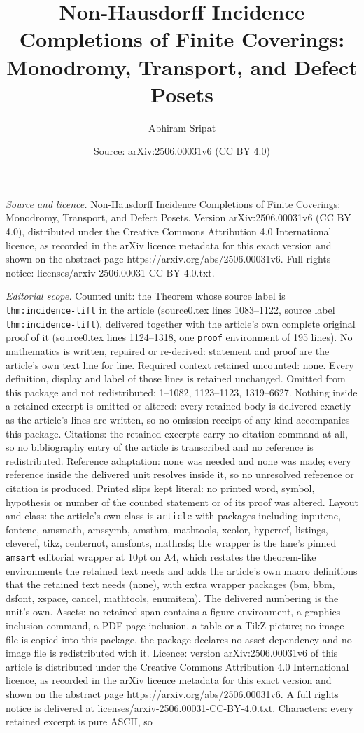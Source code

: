 \documentclass[10pt,a4paper]{amsart}
\title[Non-Hausdorff Incidence Completions of Finite Coverings: Mon]{Non-Hausdorff Incidence Completions of Finite Coverings: Monodromy, Transport, and Defect Posets}
\author{Abhiram Sripat}
\date{Source: arXiv:2506.00031v6 (CC BY 4.0)}
\begin{document}
\maketitle

\noindent\emph{Source and licence.} Non-Hausdorff Incidence Completions of Finite Coverings: Monodromy, Transport, and Defect Posets. Version arXiv:2506.00031v6 (CC BY 4.0), distributed under the Creative Commons Attribution 4.0 International licence, as recorded in the arXiv licence metadata for this exact version and shown on the abstract page https://arxiv.org/abs/2506.00031v6. Full rights notice: licenses/arxiv-2506.00031-CC-BY-4.0.txt.\par\smallskip

\noindent\textit{Editorial scope.} Counted unit: the Theorem whose source label is \texttt{thm:incidence-lift} in the article (source0.tex lines 1083--1122, source label \texttt{thm:incidence-lift}), delivered together with the article's own complete original proof of it (source0.tex lines 1124--1318, one \texttt{proof} environment of 195 lines). No mathematics is written, repaired or re-derived: statement and proof are the article's own text line for line. Required context retained uncounted: none. Every definition, display and label of those lines is retained unchanged. Omitted from this package and not redistributed: 1--1082, 1123--1123, 1319--6627. Nothing inside a retained excerpt is omitted or altered: every retained body is delivered exactly as the article's lines are written, so no omission receipt of any kind accompanies this package. Citations: the retained excerpts carry no citation command at all, so no bibliography entry of the article is transcribed and no reference is redistributed. Reference adaptation: none was needed and none was made; every reference inside the delivered unit resolves inside it, so no unresolved reference or citation is produced. Printed slips kept literal: no printed word, symbol, hypothesis or number of the counted statement or of its proof was altered. Layout and class: the article's own class is \texttt{article} with packages including inputenc, fontenc, amsmath, amssymb, amsthm, mathtools, xcolor, hyperref, listings, cleveref, tikz, centernot, amsfonts, mathrsfs; the wrapper is the lane's pinned \texttt{amsart} editorial wrapper at 10pt on A4, which restates the theorem-like environments the retained text needs and adds the article's own macro definitions that the retained text needs (none), with extra wrapper packages (bm, bbm, dsfont, xspace, cancel, mathtools, enumitem). The delivered numbering is the unit's own. Assets: no retained span contains a figure environment, a graphics-inclusion command, a PDF-page inclusion, a table or a TikZ picture; no image file is copied into this package, the package declares no asset dependency and no image file is redistributed with it. Licence: version arXiv:2506.00031v6 of this article is distributed under the Creative Commons Attribution 4.0 International licence, as recorded in the arXiv licence metadata for this exact version and shown on the abstract page https://arxiv.org/abs/2506.00031v6. A full rights notice is delivered at licenses/arxiv-2506.00031-CC-BY-4.0.txt. Characters: every retained excerpt is pure ASCII, so 
\end{document}
